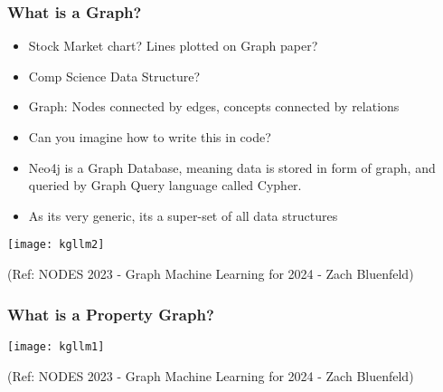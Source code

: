 
\begin{frame}[fragile]\frametitle{What is a Graph?}

\begin{itemize}
\item Stock Market chart? Lines plotted on Graph paper?
\item Comp Science Data Structure?
\item Graph: Nodes connected by edges, concepts connected by relations
\item Can you imagine how to write this in code?
\item Neo4j is a Graph Database, meaning data is stored in form of graph, and queried by Graph Query language called Cypher.
\item As its very generic, its a super-set of all data structures
\end{itemize}

\begin{center}
\texttt{[image: kgllm2]}
\end{center}	

{\tiny (Ref: NODES 2023 - Graph Machine Learning for 2024 - Zach Bluenfeld)}
\end{frame}

\begin{frame}[fragile]\frametitle{What is a Property Graph?}

\begin{center}
\texttt{[image: kgllm1]}
\end{center}	

{\tiny (Ref: NODES 2023 - Graph Machine Learning for 2024 - Zach Bluenfeld)}
\end{frame}


